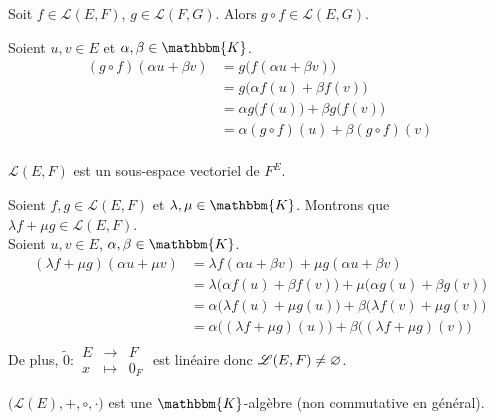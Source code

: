 \begin{prop}
	Soit $f \in \mathcal{L}(E, F)$, $g \in \mathcal{L}(F, G)$. Alors $g \circ f \in \mathcal{L}(E, G)$.
\end{prop}

\begin{prv}
	Soient $u,v \in E$ et $\alpha, \beta \in \mathbbm{K}$.
	\begin{align*}
		(g \circ f)(\alpha u + \beta v) &= g\big(f(\alpha u + \beta v)\big) \\
		&= g\big(\alpha f(u) + \beta f(v)\big) \\
		&= \alpha g\big(f(u)\big) + \beta g\big(f(v)\big) \\
		&= \alpha (g \circ f)(u) + \beta (g \circ f)(v) \\
	\end{align*}
\end{prv}

\begin{prop}
	$\mathcal{L}(E,F)$ est un sous-espace vectoriel de $F^E$.
\end{prop}

\begin{prv}
	Soient $f, g \in \mathcal{L}(E,F)$ et $\lambda, \mu \in \mathbbm{K}$. Montrons que $\lambda f + \mu g \in \mathcal{L}(E, F)$.\\
	Soient $u,v \in E$, $\alpha, \beta \in \mathbbm{K}$.
	\begin{align*}
		(\lambda f + \mu g) (\alpha u + \mu v) &= \lambda f(\alpha u + \beta v) + \mu g(\alpha u + \beta v) \\
		&= \lambda\big(\alpha f(u) + \beta f(v) \big) + \mu\big(\alpha g(u) + \beta g(v) \big) \\
		&= \alpha \big(\lambda f(u) + \mu g(u)\big) + \beta\big(\lambda f(v) + \mu g(v)\big) \\
		&= \alpha \big( (\lambda f + \mu g)(u) \big) + \beta \big((\lambda f + \mu g)(v)\big)\\
	\end{align*}
	De plus, $\tilde0 : \begin{array}{rcl}
		E &\longrightarrow& F \\
		x &\longmapsto& 0_F
	\end{array}$ est linéaire donc $\mathcal{L}(E, F) \neq \varnothing$.
\end{prv}

\begin{prop}
	$\big(\mathcal{L}(E), +,  \circ, \cdot\big)$ est une $\mathbbm{K}$-algèbre (non commutative en général).
\end{prop}

